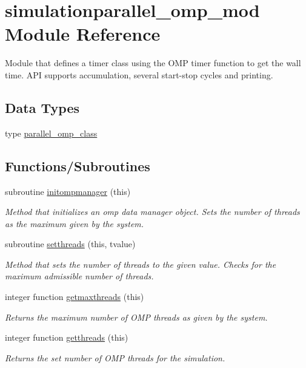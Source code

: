 \hypertarget{namespacesimulationparallel__omp__mod}{}\section{simulationparallel\+\_\+omp\+\_\+mod Module Reference}
\label{namespacesimulationparallel__omp__mod}


Module that defines a timer class using the O\+MP timer function to get the wall time. A\+PI supports accumulation, several start-\/stop cycles and printing.  


\subsection*{Data Types}
\begin{DoxyCompactItemize}
\item 
type \mbox{\hyperlink{structsimulationparallel__omp__mod_1_1parallel__omp__class}{parallel\+\_\+omp\+\_\+class}}
\end{DoxyCompactItemize}
\subsection*{Functions/\+Subroutines}
\begin{DoxyCompactItemize}
\item 
subroutine \mbox{\hyperlink{namespacesimulationparallel__omp__mod_a43af0d6de562e53dfbaa874bce957ba9}{initompmanager}} (this)
\begin{DoxyCompactList}\small\item\em Method that initializes an omp data manager object. Sets the number of threads as the maximum given by the system. \end{DoxyCompactList}\item 
subroutine \mbox{\hyperlink{namespacesimulationparallel__omp__mod_ac5d0e4616b102fc7f4edddf8285fb61f}{setthreads}} (this, tvalue)
\begin{DoxyCompactList}\small\item\em Method that sets the number of threads to the given value. Checks for the maximum admissible number of threads. \end{DoxyCompactList}\item 
integer function \mbox{\hyperlink{namespacesimulationparallel__omp__mod_af3219ed75e38a01f71255314b2cd9eee}{getmaxthreads}} (this)
\begin{DoxyCompactList}\small\item\em Returns the maximum number of O\+MP threads as given by the system. \end{DoxyCompactList}\item 
integer function \mbox{\hyperlink{namespacesimulationparallel__omp__mod_a1f07ce2cf6390af06c3478e6271644e5}{getthreads}} (this)
\begin{DoxyCompactList}\small\item\em Returns the set number of O\+MP threads for the simulation. \end{DoxyCompactList}\end{DoxyCompactItemize}
